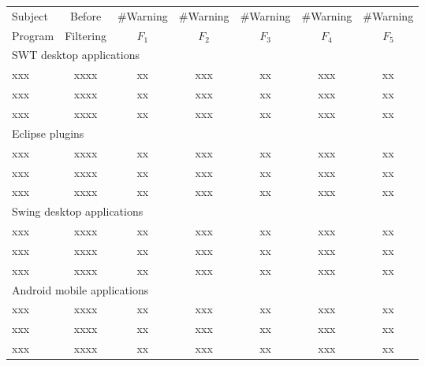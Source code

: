 \begin{table}[t]
\begin{center}
 \fontsize{9pt}{\baselineskip}\selectfont
\setlength{\tabcolsep}{.30\tabcolsep}
\hspace*{-0.2cm}
\begin{tabular}{|l||c|c|c|c|c|c|}
\hline
 Subject & Before & \#Warning & \#Warning & \#Warning & \#Warning& \#Warning \\
 Program & Filtering & $F_1$ & $F_2$ & $F_3$&$F_4$ & $F_5$\\
\hline \hline
\multicolumn{7}{|l|}{SWT desktop applications}   \\
 \hline
 xxx &  xxxx &  xx &  xxx & xx &  xxx & xx\\
 \hline
 xxx &  xxxx &  xx &  xxx & xx &  xxx & xx\\
 \hline
 xxx &  xxxx &  xx &  xxx & xx &  xxx & xx\\
 \hline
 \hline
\multicolumn{7}{|l|}{Eclipse plugins}   \\
 \hline
 xxx &  xxxx &  xx &  xxx & xx &  xxx & xx\\
 \hline
 xxx &  xxxx &  xx &  xxx & xx &  xxx & xx\\
 \hline
 xxx &  xxxx &  xx &  xxx & xx &  xxx & xx\\
 \hline
 \hline
\multicolumn{7}{|l|}{Swing desktop applications}   \\
 \hline
 xxx &  xxxx &  xx &  xxx & xx &  xxx & xx\\
 \hline
 xxx &  xxxx &  xx &  xxx & xx &  xxx & xx\\
 \hline
 xxx &  xxxx &  xx &  xxx & xx &  xxx & xx\\
 \hline
 \hline
\multicolumn{7}{|l|}{Android mobile applications}   \\
 \hline
 xxx &  xxxx &  xx &  xxx & xx &  xxx & xx\\
 \hline
 xxx &  xxxx &  xx &  xxx & xx &  xxx & xx\\
 \hline
 xxx &  xxxx &  xx &  xxx & xx &  xxx & xx\\
\hline
\end{tabular}
\end{center}
\vspace{-15pt}
\end{table}


